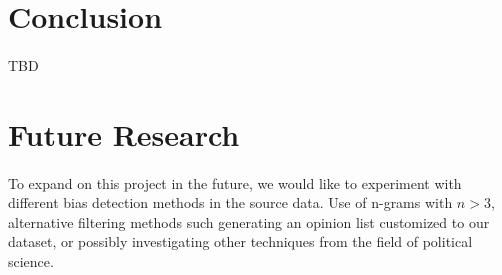 \documentclass[10pt,a4paper,onecolumn]{article}
\begin{document}
%

\section{Conclusion}
\paragraph{}
TBD

\section*{Future Research}
\paragraph{}
To expand on this project in the future, we would like to experiment with different bias detection methods in the source data. Use of n-grams with $ n > 3 $, alternative filtering methods such generating an opinion list customized to our dataset, or possibly investigating other techniques from the field of political science. 
\end{document}

